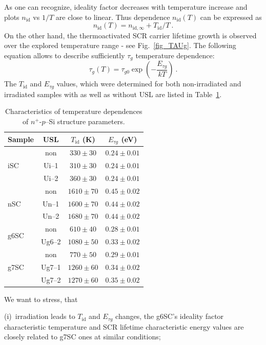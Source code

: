 \documentclass[aip,jap, amsmath,amssymb,reprint]{revtex4-1}
\begin{document}
As one can recognize, ideality factor decreases with temperature increase and plots $n_{\mathrm{id}}$ vs $1/T$  are close to linear.
Thus dependence $n_{\mathrm{id}}(T)$ can be expressed as
\begin{equation}
\label{eq_nT}
    n_{\mathrm{id}}(T)=n_{\mathrm{id},\infty}+T_{\mathrm{id}}/T\:.
\end{equation}
On the other hand, the thermoactivated SCR carrier lifetime growth  is observed over the explored temperature range - see Fig.~\ref{fig_TAUg}.
The following equation allows to describe sufficiently $\tau_{g}$ temperature dependence:
\begin{equation}
\label{eq_TAUgT}
    \tau_{g}(T)=\tau_{g0}\exp\left(-\frac{E_{\tau g}}{kT}\right)\:.
\end{equation}
The $T_{\mathrm{id}}$ and $E_{\tau g}$ values, which were determined for both non-irradiated and irradiated samples with as well as without USL are listed in Table~\ref{tabTpar}.

\begin{table}
\caption{\label{tabTpar}Characteristics of temperature dependences of $n^+$-$p$--Si structure parameters.
}
\begin{ruledtabular}
\begin{tabular}{lccc}
Sample&USL&$T_{\mathrm{id}}$ (K)&$E_{\tau g}$ (eV)\\
\hline
\multirow{3}{*}{iSC}&non&$330\pm30$&$0.24\pm0.01$\\
&Ui--1&$310\pm30$&$0.24\pm0.01$\\
&Ui--2&$360\pm30$&$0.24\pm0.01$\\
\multirow{3}{*}{nSC}&non&$1610\pm70$&$0.45\pm0.02$\\
&Un--1&$1600\pm70$&$0.44\pm0.02$\\
&Un--2&$1680\pm70$&$0.44\pm0.02$\\
\multirow{2}{*}{g6SC}&non&$610\pm40$&$0.28\pm0.01$\\
&Ug6--2&$1080\pm50$&$0.33\pm0.02$\\
\multirow{3}{*}{g7SC}&non&$770\pm50$&$0.29\pm0.01$\\
&Ug7--1&$1260\pm60$&$0.34\pm0.02$\\
&Ug7--2&$1270\pm60$&$0.35\pm0.02$\\
\end{tabular}
\end{ruledtabular}
\end{table}

We want to stress, that

\noindent
(i)~irradiation leads to $T_{\mathrm{id}}$ and $E_{\tau g}$ changes, the g6SC's ideality factor characteristic temperature and SCR lifetime characteristic energy values are closely related to g7SC ones at similar conditions;
\end{document}
